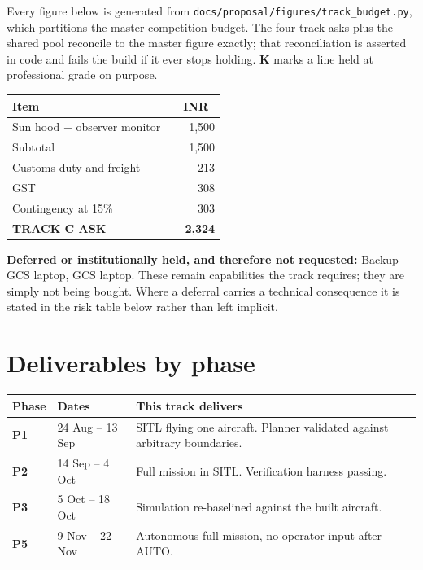 \documentclass[11pt,a4paper]{article}
\newcommand{\inr}[1]{INR~#1}
\begin{document}
Every figure below is generated from
\texttt{docs/proposal/figures/track\_budget.py}, which partitions the master
competition budget. The four track asks plus the shared pool reconcile to the
master figure exactly; that reconciliation is asserted in code and fails the
build if it ever stops holding. \textbf{K} marks a line held at professional
grade on purpose.


\begin{center}
\begin{tabular}{@{}p{88mm}cr@{}}
\toprule
\textbf{Item} & & \textbf{\inr{}} \\
\midrule
Sun hood + observer monitor &  & 1,500 \\
\midrule
Subtotal & & 1,500 \\
Customs duty and freight & & 213 \\
GST & & 308 \\
Contingency at 15\% & & 303 \\
\midrule
\textbf{TRACK C ASK} & & \textbf{2,324} \\
\bottomrule
\end{tabular}
\end{center}


\textbf{Deferred or institutionally held, and therefore not requested:}
Backup GCS laptop, GCS laptop. These remain capabilities the track requires; they are simply not being
bought. Where a deferral carries a technical consequence it is stated in the
risk table below rather than left implicit.

\section{Deliverables by phase}

\begin{center}
\begin{tabular}{@{}llp{88mm}@{}}
\toprule
\textbf{Phase} & \textbf{Dates} & \textbf{This track delivers} \\
\midrule
\textbf{P1} & 24 Aug -- 13 Sep & SITL flying one aircraft. Planner validated against arbitrary boundaries. \\
\textbf{P2} & 14 Sep -- 4 Oct & Full mission in SITL. Verification harness passing. \\
\textbf{P3} & 5 Oct -- 18 Oct & Simulation re-baselined against the built aircraft. \\
\textbf{P5} & 9 Nov -- 22 Nov & Autonomous full mission, no operator input after AUTO. \\
\bottomrule
\end{tabular}
\end{center}
\end{document}
